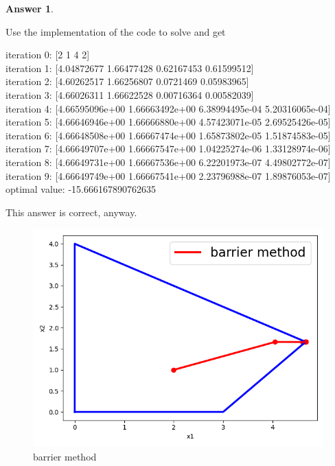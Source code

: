 \documentclass{article}
\theoremstyle{definition}
\newtheorem{ans}{Answer}
\begin{document}
\begin{ans}
\begin{enumerate}[(a)]
			Use the implementation of the code to solve and get 
			
			iteration 0: [2 1 4 2]\\
			iteration 1: [4.04872677 1.66477428 0.62167453 0.61599512]\\
			iteration 2: [4.60262517 1.66256807 0.0721469  0.05983965]\\
			iteration 3: [4.66026311 1.66622528 0.00716364 0.00582039]\\
			iteration 4: [4.66595096e+00 1.66663492e+00 6.38994495e-04 5.20316065e-04]\\
			iteration 5: [4.66646946e+00 1.66666880e+00 4.57423071e-05 2.69525426e-05]\\
			iteration 6: [4.66648508e+00 1.66667474e+00 1.65873802e-05 1.51874583e-05]\\
			iteration 7: [4.66649707e+00 1.66667547e+00 1.04225274e-06 1.33128974e-06]\\
			iteration 8: [4.66649731e+00 1.66667536e+00 6.22201973e-07 4.49802772e-07]\\
			iteration 9: [4.66649749e+00 1.66667541e+00 2.23796988e-07 1.89876053e-07]\\
			optimal value: -15.666167890762635			
			
			This answer is correct, anyway.
		\begin{figure}[h]
			\centering
			\includegraphics[width=0.5\linewidth]{../p2}
			\caption{barrier method}
		\end{figure}
		\end{enumerate}
	\end{ans}
	
\end{document}
